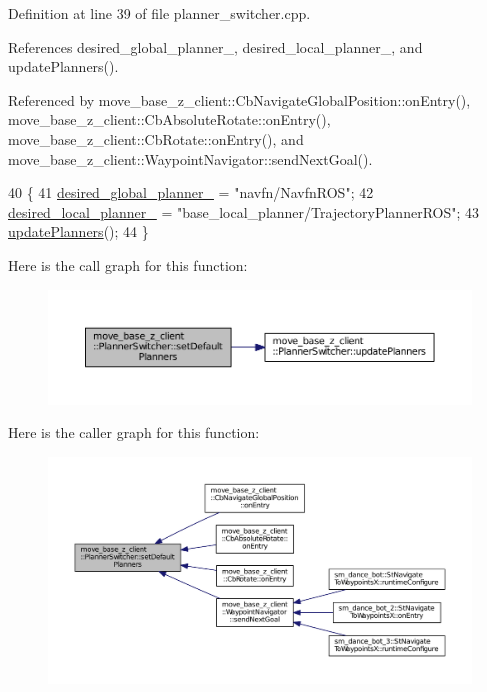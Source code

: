 Definition at line 39 of file planner\+\_\+switcher.\+cpp.



References desired\+\_\+global\+\_\+planner\+\_\+, desired\+\_\+local\+\_\+planner\+\_\+, and update\+Planners().



Referenced by move\+\_\+base\+\_\+z\+\_\+client\+::\+Cb\+Navigate\+Global\+Position\+::on\+Entry(), move\+\_\+base\+\_\+z\+\_\+client\+::\+Cb\+Absolute\+Rotate\+::on\+Entry(), move\+\_\+base\+\_\+z\+\_\+client\+::\+Cb\+Rotate\+::on\+Entry(), and move\+\_\+base\+\_\+z\+\_\+client\+::\+Waypoint\+Navigator\+::send\+Next\+Goal().


\begin{DoxyCode}
40 \{
41   \hyperlink{classmove__base__z__client_1_1PlannerSwitcher_a004c15858f0a6b9abcd8211d58a7e34c}{desired\_global\_planner\_} = \textcolor{stringliteral}{"navfn/NavfnROS"};
42   \hyperlink{classmove__base__z__client_1_1PlannerSwitcher_ae47bd6c9c70b27cddcb394f26bb9372d}{desired\_local\_planner\_} = \textcolor{stringliteral}{"base\_local\_planner/TrajectoryPlannerROS"};
43   \hyperlink{classmove__base__z__client_1_1PlannerSwitcher_a189ac8c027169a111c7d8e14d864752f}{updatePlanners}();
44 \}
\end{DoxyCode}


Here is the call graph for this function\+:
\nopagebreak
\begin{figure}[H]
\begin{center}
\leavevmode
\includegraphics[width=350pt]{classmove__base__z__client_1_1PlannerSwitcher_aa31306368ab2a5145c024c0c1a580547_cgraph}
\end{center}
\end{figure}




Here is the caller graph for this function\+:
\nopagebreak
\begin{figure}[H]
\begin{center}
\leavevmode
\includegraphics[width=350pt]{classmove__base__z__client_1_1PlannerSwitcher_aa31306368ab2a5145c024c0c1a580547_icgraph}
\end{center}
\end{figure}



